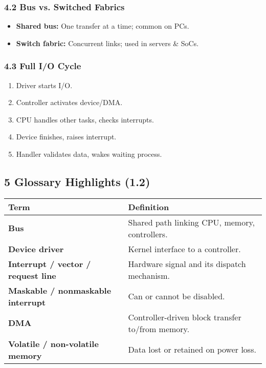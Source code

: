 \documentclass{article}
\begin{document}
\subsubsection*{4.2 Bus vs. Switched Fabrics}
\begin{itemize}
    \item \textbf{Shared bus:} One transfer at a time; common on PCs.
    \item \textbf{Switch fabric:} Concurrent links; used in servers \& SoCs.
\end{itemize}

\subsubsection*{4.3 Full I/O Cycle}
\begin{enumerate}[label=\arabic*.]
    \item Driver starts I/O.
    \item Controller activates device/DMA.
    \item CPU handles other tasks, checks interrupts.
    \item Device finishes, raises interrupt.
    \item Handler validates data, wakes waiting process.
\end{enumerate}

\subsection*{5 Glossary Highlights (1.2)}
\centering
\begin{tabular}{>{\raggedright}p{} >{\raggedright\arraybackslash}p{}}
\toprule
\textbf{Term} & \textbf{Definition} \\
\midrule
\textbf{Bus} & Shared path linking CPU, memory, controllers. \\
\textbf{Device driver} & Kernel interface to a controller. \\
\textbf{Interrupt / vector / request line} & Hardware signal and its dispatch mechanism. \\
\textbf{Maskable / nonmaskable interrupt} & Can or cannot be disabled. \\
\textbf{DMA} & Controller-driven block transfer to/from memory. \\
\textbf{Volatile / non-volatile memory} & Data lost or retained on power loss. \\
\bottomrule
\end{tabular}
\vspace{\baselineskip}
\end{document}
